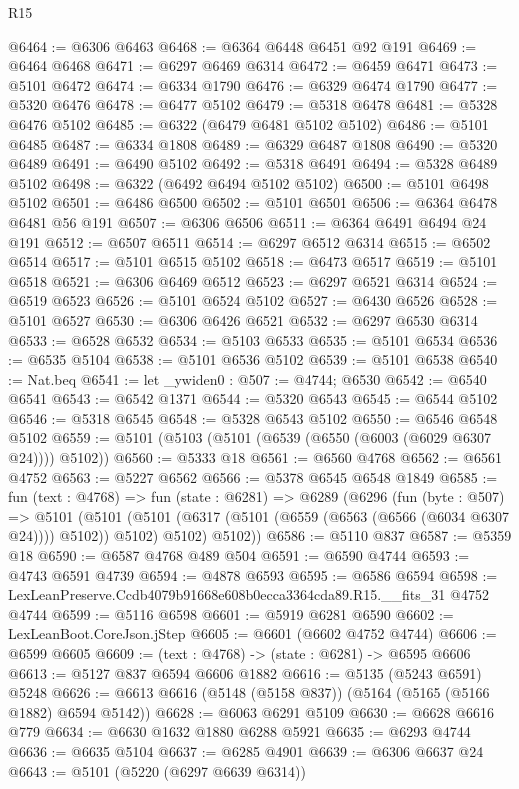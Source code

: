 \begin{lexlean}{R15}
\begin{coremodule}
{{{{{{{{{{{@6464 := @6306 @6463
@6468 := @6364 @6448 @6451 @92 @191
@6469 := @6464 @6468
@6471 := @6297 @6469 @6314
@6472 := @6459 @6471
@6473 := @5101 @6472
@6474 := @6334 @1790
@6476 := @6329 @6474 @1790
@6477 := @5320 @6476
@6478 := @6477 @5102
@6479 := @5318 @6478
@6481 := @5328 @6476 @5102
@6485 := @6322 (@6479 @6481 @5102 @5102)
@6486 := @5101 @6485
@6487 := @6334 @1808
@6489 := @6329 @6487 @1808
@6490 := @5320 @6489
@6491 := @6490 @5102
@6492 := @5318 @6491
@6494 := @5328 @6489 @5102
@6498 := @6322 (@6492 @6494 @5102 @5102)
@6500 := @5101 @6498 @5102
@6501 := @6486 @6500
@6502 := @5101 @6501
@6506 := @6364 @6478 @6481 @56 @191
@6507 := @6306 @6506
@6511 := @6364 @6491 @6494 @24 @191
@6512 := @6507 @6511
@6514 := @6297 @6512 @6314
@6515 := @6502 @6514
@6517 := @5101 @6515 @5102
@6518 := @6473 @6517
@6519 := @5101 @6518
@6521 := @6306 @6469 @6512
@6523 := @6297 @6521 @6314
@6524 := @6519 @6523
@6526 := @5101 @6524 @5102
@6527 := @6430 @6526
@6528 := @5101 @6527
@6530 := @6306 @6426 @6521
@6532 := @6297 @6530 @6314
@6533 := @6528 @6532
@6534 := @5103 @6533
@6535 := @5101 @6534
@6536 := @6535 @5104
@6538 := @5101 @6536 @5102
@6539 := @5101 @6538
@6540 := Nat.beq
@6541 := let _ywiden0 : @507 := @4744; @6530
@6542 := @6540 @6541
@6543 := @6542 @1371
@6544 := @5320 @6543
@6545 := @6544 @5102
@6546 := @5318 @6545
@6548 := @5328 @6543 @5102
@6550 := @6546 @6548 @5102
@6559 := @5101 (@5103 (@5101 (@6539 (@6550 (@6003 (@6029 @6307 @24)))) @5102))
@6560 := @5333 @18
@6561 := @6560 @4768
@6562 := @6561 @4752
@6563 := @5227 @6562
@6566 := @5378 @6545 @6548 @1849
@6585 := fun (text : @4768) =>
  fun (state : @6281) =>
  @6289
    (@6296
      (fun (byte : @507) =>
      @5101
        (@5101 (@5101 (@6317 (@5101 (@6559 (@6563 (@6566 (@6034 @6307 @24)))) @5102)) @5102) @5102)
        @5102))
@6586 := @5110 @837
@6587 := @5359 @18
@6590 := @6587 @4768 @489 @504
@6591 := @6590 @4744
@6593 := @4743 @6591 @4739
@6594 := @4878 @6593
@6595 := @6586 @6594
@6598 := LexLeanPreserve.Ccdb4079b91668e608b0ecca3364cda89.R15.__fits_31 @4752 @4744
@6599 := @5116 @6598
@6601 := @5919 @6281 @6590
@6602 := LexLeanBoot.CoreJson.jStep
@6605 := @6601 (@6602 @4752 @4744)
@6606 := @6599 @6605
@6609 := (text : @4768) -> (state : @6281) -> @6595 @6606
@6613 := @5127 @837 @6594 @6606 @1882
@6616 := @5135 (@5243 @6591) @5248
@6626 := @6613 @6616 (@5148 (@5158 @837)) (@5164 (@5165 (@5166 @1882) @6594 @5142))
@6628 := @6063 @6291 @5109
@6630 := @6628 @6616 @779
@6634 := @6630 @1632 @1880 @6288 @5921
@6635 := @6293 @4744
@6636 := @6635 @5104
@6637 := @6285 @4901
@6639 := @6306 @6637 @24
@6643 := @5101 (@5220 (@6297 @6639 @6314))
}}}}}}}}}}}
\end{coremodule}
\end{lexlean}

